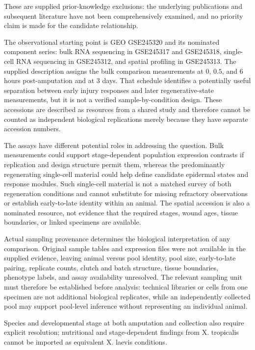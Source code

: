 \documentclass[11pt]{article}
\begin{document}
These are supplied prior-knowledge exclusions: the underlying publications and subsequent literature have not been comprehensively examined, and no priority claim is made for the candidate relationship.

The observational starting point is GEO GSE245320 and its nominated component series: bulk RNA sequencing in GSE245317 and GSE245318, single-cell RNA sequencing in GSE245312, and spatial profiling in GSE245313. The supplied description assigns the bulk comparison measurements at $0$, $0.5$, and $6$ hours post-amputation and at $3$ days. That schedule identifies a potentially useful separation between early injury responses and later regenerative-state measurements, but it is not a verified sample-by-condition design. These accessions are described as resources from a shared study and therefore cannot be counted as independent biological replications merely because they have separate accession numbers.

The assays have different potential roles in addressing the question. Bulk measurements could support stage-dependent population expression contrasts if replication and design structure permit them, whereas the predominantly regenerating single-cell material could help define candidate epidermal states and response modules. Such single-cell material is not a matched survey of both regeneration conditions and cannot substitute for missing refractory observations or establish early-to-late identity within an animal. The spatial accession is also a nominated resource, not evidence that the required stages, wound ages, tissue boundaries, or linked specimens are available.

Actual sampling provenance determines the biological interpretation of any comparison. Original sample tables and expression files were not available in the supplied evidence, leaving animal versus pool identity, pool size, early-to-late pairing, replicate counts, clutch and batch structure, tissue boundaries, phenotype labels, and assay availability unresolved. The relevant sampling unit must therefore be established before analysis: technical libraries or cells from one specimen are not additional biological replicates, while an independently collected pool may support pool-level inference without representing an individual animal.

Species and developmental stage at both amputation and collection also require explicit resolution; nutritional and stage-dependent findings from X. tropicalis cannot be imported as equivalent X. laevis conditions.
\end{document}
